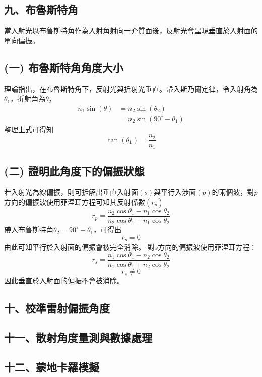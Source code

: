 \subsection*{九、布魯斯特角}
當入射光以布魯斯特角作為入射角射向一介質面後，反射光會呈現垂直於入射面的單向偏振。

\subsection*{(一) 布魯斯特角角度大小}
理論指出，在布魯斯特角下，反射光與折射光垂直。帶入斯乃爾定律，令入射角為$\theta_1$，折射角為$\theta_2$
\begin{align}
    n_1\sin\left(\theta\right)&= n_2\sin\left(\theta_2\right)\\
    &= n_2\sin\left(90^\circ-\theta_1\right)
\end{align}
整理上式可得知
\begin{equation}
    \tan\left(\theta_1\right) = \frac{n_2}{n_1}
\end{equation}

\subsection*{(二) 證明此角度下的偏振狀態}
若入射光為線偏振，則可拆解出垂直入射面\((s)\)與平行入涉面$(p)$的兩個波，對$p$方向的偏振波使用菲涅耳方程可知其反射係數$(r_{p})$
\begin{equation}
    r_{p}=\frac{n_{2}\cos \theta _{1}-n_{1}\cos \theta _{2}}{n_{2}\cos \theta _{1}+n_{1}\cos \theta _{2}}
\end{equation}
帶入布魯斯特角$\theta_2 = 90^\circ-\theta_1$，可得出
\begin{equation}
    r_{p} = 0
\end{equation}
由此可知平行於入射面的偏振會被完全消除。
對$s$方向的偏振波使用菲涅耳方程：
\begin{equation}
r_{s}=\frac{n_{1}\cos \theta _{1}-n_{2}\cos \theta _{2}}{n_{1}\cos \theta _{1}+n_{2}\cos \theta _{2}} 
\end{equation}
\begin{equation}
    r_s \neq 0
\end{equation}
因此垂直於入射面的偏振不會被消除。

\subsection*{十、校準雷射偏振角度}


\subsection*{十一、散射角度量測與數據處理}



\subsection*{十二、蒙地卡羅模擬}
